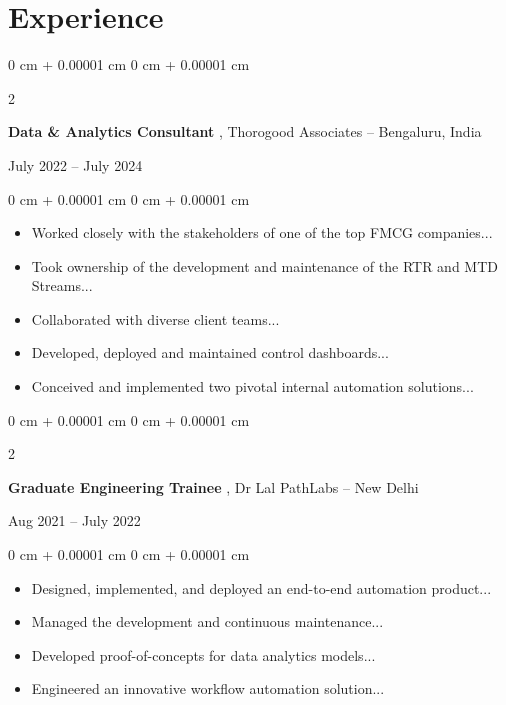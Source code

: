 \documentclass[10pt, letterpaper]{article}
\newenvironment{highlights}{
      \begin{itemize}[
          topsep=0.10 cm,
          parsep=0.10 cm,
          partopsep=0pt,
          itemsep=0pt,
          leftmargin=0 cm + 10pt
      ]
  }{
      \end{itemize}
  } %
\newenvironment{onecolentry}{
    \begin{adjustwidth}{
        0 cm + 0.00001 cm
    }{
        0 cm + 0.00001 cm
    }
  }{
      \end{adjustwidth}
  } %
\newenvironment{twocolentry}[2][]{
      \onecolentry
      \def\secondColumn{#2}
      \setcolumnwidth{\fill, 4.5 cm}
      \begin{paracol}{2}
  }{
      \switchcolumn \raggedleft \secondColumn
      \end{paracol}
      \endonecolentry
  }
\begin{document}
  \section{Experience} 
    
    \begin{twocolentry}{ July 2022 -- July 2024 }
        \textbf{ Data \& Analytics Consultant }, Thorogood Associates -- Bengaluru, India
    \end{twocolentry}

    \vspace{0.10 cm}
    \begin{onecolentry}
    \begin{highlights}
    
        \item Worked closely with the stakeholders of one of the top FMCG companies...
    
        \item Took ownership of the development and maintenance of the RTR and MTD Streams...
    
        \item Collaborated with diverse client teams...
    
        \item Developed, deployed and maintained control dashboards...
    
        \item Conceived and implemented two pivotal internal automation solutions...
    
    \end{highlights}
    \end{onecolentry}
    \vspace{0.2 cm}
    
    \begin{twocolentry}{ Aug 2021 -- July 2022 }
        \textbf{ Graduate Engineering Trainee }, Dr Lal PathLabs -- New Delhi
    \end{twocolentry}

    \vspace{0.10 cm}
    \begin{onecolentry}
    \begin{highlights}
    
        \item Designed, implemented, and deployed an end-to-end automation product...
    
        \item Managed the development and continuous maintenance...
    
        \item Developed proof-of-concepts for data analytics models...
    
        \item Engineered an innovative workflow automation solution...
    
    \end{highlights}
    \end{onecolentry}
    \vspace{0.2 cm}
    
\end{document}
